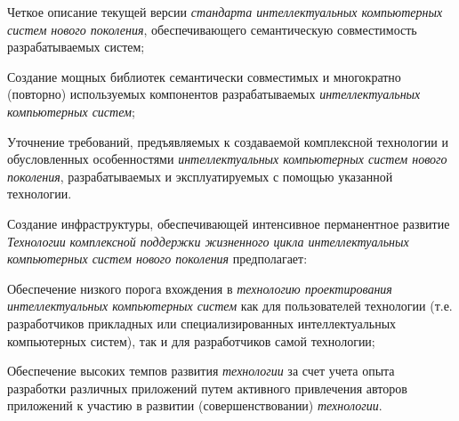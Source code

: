 \begin{textitemize}
	\item
	Четкое описание текущей версии \textit{стандарта интеллектуальных компьютерных систем нового поколения}, обеспечивающего семантическую совместимость разрабатываемых систем;
	\item
	Создание мощных библиотек семантически совместимых и многократно (повторно) используемых компонентов разрабатываемых \textit{интеллектуальных компьютерных систем};
	\item
	Уточнение требований, предъявляемых к создаваемой комплексной технологии и обусловленных особенностями \textit{интеллектуальных компьютерных систем нового поколения}, разрабатываемых и эксплуатируемых с помощью указанной технологии.
\end{textitemize}

Создание инфраструктуры, обеспечивающей интенсивное перманентное развитие \textit{Технологии} \textit{комплексной поддержки жизненного цикла интеллектуальных компьютерных систем нового поколения} предполагает:

\begin{textitemize}
	\item
	Обеспечение низкого порога вхождения в \textit{технологию проектирования интеллектуальных компьютерных систем} как для пользователей технологии (т.е. разработчиков прикладных или специализированных интеллектуальных компьютерных систем), так и для разработчиков самой технологии;
	\item
	Обеспечение высоких темпов развития \textit{технологии} за счет учета опыта разработки различных приложений путем активного привлечения авторов приложений к участию в развитии (совершенствовании) \textit{технологии}.
\end{textitemize}

